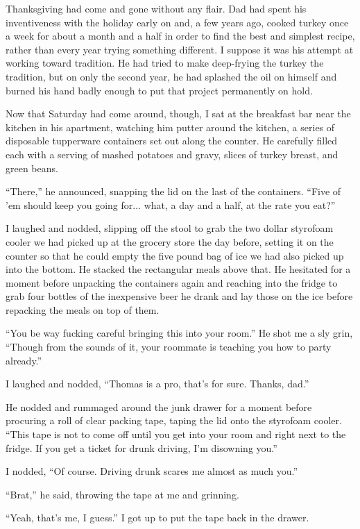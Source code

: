 Thanksgiving had come and gone without any flair.  Dad had spent his inventiveness with the holiday early on and, a few years ago, cooked turkey once a week for about a month and a half in order to find the best and simplest recipe, rather than every year trying something different.  I suppose it was his attempt at working toward tradition.  He had tried to make deep-frying the turkey the tradition, but on only the second year, he had splashed the oil on himself and burned his hand badly enough to put that project permanently on hold.

Now that Saturday had come around, though, I sat at the breakfast bar near the kitchen in his apartment, watching him putter around the kitchen, a series of disposable tupperware containers set out along the counter.  He carefully filled each with a serving of mashed potatoes and gravy, slices of turkey breast, and green beans.

``There,'' he announced, snapping the lid on the last of the containers.  ``Five of 'em should keep you going for... what, a day and a half, at the rate you eat?''

I laughed and nodded, slipping off the stool to grab the two dollar styrofoam cooler we had picked up at the grocery store the day before, setting it on the counter so that he could empty the five pound bag of ice we had also picked up into the bottom.  He stacked the rectangular meals above that.  He hesitated for a moment before unpacking the containers again and reaching into the fridge to grab four bottles of the inexpensive beer he drank and lay those on the ice before repacking the meals on top of them.

``You be way fucking careful bringing this into your room.''  He shot me a sly grin, ``Though from the sounds of it, your roommate is teaching you how to party already.''

I laughed and nodded, ``Thomas is a pro, that's for sure.  Thanks, dad.''

He nodded and rummaged around the junk drawer for a moment before procuring a roll of clear packing tape, taping the lid onto the styrofoam cooler.  ``This tape is not to come off until you get into your room and right next to the fridge.  If you get a ticket for drunk driving, I'm disowning you.''

I nodded, ``Of course.  Driving drunk scares me almost as much you.''

``Brat,'' he said, throwing the tape at me and grinning.

``Yeah, that's me, I guess.''  I got up to put the tape back in the drawer.

